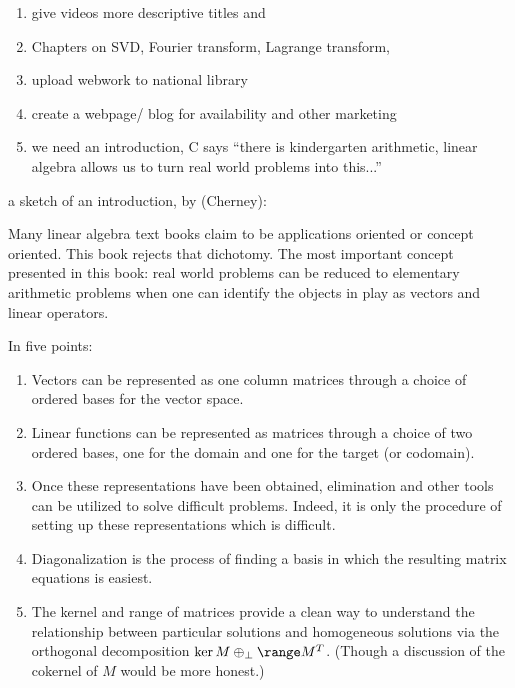 \documentclass[12pt]{article}
\begin{document}
\begin{enumerate}
\item give videos more descriptive titles and 

\item Chapters on SVD, Fourier transform, Lagrange transform, 

\item upload webwork to national library

\item create a webpage/ blog for availability and other marketing 

\item we need an introduction, C says ``there is kindergarten arithmetic,
linear algebra allows us to turn real world problems into this...''

\end{enumerate}


a sketch of an introduction, by (Cherney): 

Many linear algebra text books claim to be applications oriented or concept oriented. This book rejects that dichotomy. 
The most important concept presented in this book: real world problems can be reduced to elementary arithmetic problems when one can identify the objects in play as vectors and linear operators. 

In five points: 
\begin{enumerate}
\item Vectors can be represented as one column matrices through a choice of ordered bases for the vector space.
\item Linear functions can be represented as matrices through a choice of two ordered bases, one for the domain and one for the target (or codomain).
\item Once these representations have been obtained, elimination and other tools can be utilized to solve difficult problems. Indeed, it is only the procedure of setting up these representations which is difficult. 
\item Diagonalization is the process of finding a basis in which the resulting matrix equations is easiest. 
\item The kernel and range of matrices provide a clean way to understand the relationship between particular solutions and homogeneous solutions via the orthogonal decomposition 
$\ker M \oplus_\perp \range M^T$. (Though a discussion of the cokernel of $M$ would be more honest.)
\end{enumerate}
\end{document}

